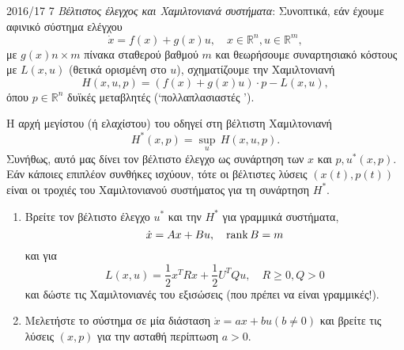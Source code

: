 \begin{exercise}{2016/17 7}
    \emph{Βέλτιστος έλεγχος και Χαμιλτονιανά συστήματα}: Συνοπτικά, εάν έχουμε
    αφινικό σύστημα ελέγχου
    \[
        \dot{x} = f(x) + g(x)u, \quad x \in \mathbb{R}^n, u \in \mathbb{R}^m,
    \]
    με \( g(x) n \times m \) πίνακα σταθερού βαθμού \( m \) και θεωρήσουμε
    συναρτησιακό κόστους με  \( L(x, u) \) (θετικά ορισμένη στο
    \( u \)), σχηματίζουμε την Χαμιλτονιανή
    \[
        H(x, u, p) = \left( f(x) + g(x)u \right)\cdot p - L(x, u),
    \]
    όπου \( p \in \mathbb{R}^n \) δυϊκές μεταβλητές
    (\enquote*{πολλαπλασιαστές }).

    Η αρχή μεγίστου (ή ελαχίστου) του  οδηγεί στη βέλτιστη
    Χαμιλτονιανή
    \[
    H^*(x, p) = \underset{u}\sup \, H(x, u, p).
    \]
    Συνήθως, αυτό μας δίνει τον βέλτιστο έλεγχο ως συνάρτηση των \( x \) και
    \( p, u^*(x, p) \). Εάν κάποιες επιπλέον συνθήκες ισχύουν, τότε οι βέλτιστες
    λύσεις \( (x(t), p(t)) \) είναι οι τροχιές του Χαμιλτονιανού συστήματος για
    τη συνάρτηση \( H^* \).
    \begin{enumerate}[label= (\alph*)]
        \item Βρείτε τον βέλτιστο έλεγχο \( u^* \) και την \( H^* \) για
            γραμμικά συστήματα,
            \[
                \dot{x} = Ax + Bu, \quad \operatorname{rank}{B} = m
            \]
            και για 
            \[
                L(x, u) = \frac{1}{2}x^{T}Rx + \frac{1}{2}U^{T}Qu, \quad R \geq
                0, Q >0
            \]
            και δώστε τις Χαμιλτονιανές του εξισώσεις (που πρέπει να είναι
            γραμμικές!).
        \item Μελετήστε το σύστημα σε μία διάσταση \( \dot{x} = ax + bu (b \neq
            0) \) και βρείτε τις λύσεις \( (x, p) \) για την ασταθή περίπτωση \(
            a > 0 \).
    \end{enumerate}
\end{exercise}
